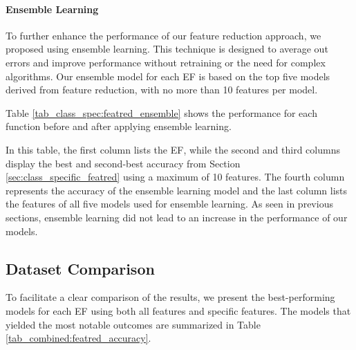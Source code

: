 \documentclass[12pt,letterpaper]{article}
\begin{document}
\paragraph{Ensemble Learning}
To further enhance the performance of our feature reduction approach, we proposed using ensemble learning.
This technique is designed to average out errors and improve performance without retraining or the need for complex algorithms.
Our ensemble model for each \ac{EF} is based on the top five models derived from feature reduction, with no more than 10 features per model.

Table \ref{tab_class_spec:featred_ensemble} shows the performance for each function before and after applying ensemble learning.



In this table, the first column lists the \ac{EF}, while the second and third columns display the best and second-best accuracy from Section \ref{sec:class_specific_featred} using a maximum of 10 features.
The fourth column represents the accuracy of the ensemble learning model and the last column lists the features of all five models used for ensemble learning.
As seen in previous sections, ensemble learning did not lead to an increase in the performance of our models.

\subsection{Dataset Comparison}
To facilitate a clear comparison of the results, we present the best-performing models for each \ac{EF} using both all features and specific features.
The models that yielded the most notable outcomes are summarized in Table \ref{tab_combined:featred_accuracy}.
\end{document}
